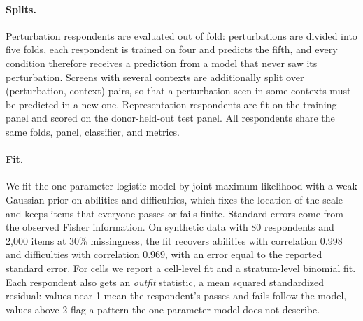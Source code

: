 \documentclass[11pt]{article}
\begin{document}
\paragraph{Splits.}
Perturbation respondents are evaluated out of fold: perturbations are divided into
five folds, each respondent is trained on four and predicts the fifth, and every
condition therefore receives a prediction from a model that never saw its
perturbation. Screens with several contexts are additionally split over
(perturbation, context) pairs, so that a perturbation seen in some contexts must be
predicted in a new one. Representation respondents are fit on the training panel and
scored on the donor-held-out test panel. All respondents share the same folds, panel,
classifier, and metrics.

\paragraph{Fit.}
We fit the one-parameter logistic model by joint maximum likelihood with a weak
Gaussian prior on abilities and difficulties, which fixes the location of the scale
and keeps items that everyone passes or fails finite. Standard errors come from the
observed Fisher information. On synthetic data with 80 respondents and 2,000 items at
30\% missingness, the fit recovers abilities with correlation 0.998 and difficulties
with correlation 0.969, with an error equal to the reported standard error. For cells
we report a cell-level fit and a stratum-level binomial fit. Each respondent also gets
an \emph{outfit} statistic, a mean squared standardized residual: values near 1 mean
the respondent's passes and fails follow the model, values above 2 flag a pattern the
one-parameter model does not describe.
\end{document}
